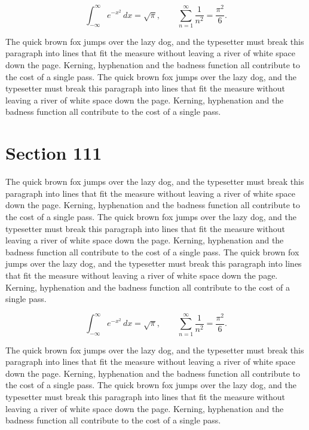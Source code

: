 \documentclass{article}
\begin{document}
\begin{equation}
\int_{-\infty}^{\infty} e^{-x^{2}}\,dx = \sqrt{\pi}, \qquad
\sum_{n=1}^{\infty} \frac{1}{n^{2}} = \frac{\pi^{2}}{6}.
\end{equation}

The quick brown fox jumps over the lazy dog, and the typesetter must break this paragraph into lines that fit the measure without leaving a river of white space down the page. Kerning, hyphenation and the badness function all contribute to the cost of a single pass. The quick brown fox jumps over the lazy dog, and the typesetter must break this paragraph into lines that fit the measure without leaving a river of white space down the page. Kerning, hyphenation and the badness function all contribute to the cost of a single pass. 
\section{Section 111}
The quick brown fox jumps over the lazy dog, and the typesetter must break this paragraph into lines that fit the measure without leaving a river of white space down the page. Kerning, hyphenation and the badness function all contribute to the cost of a single pass. The quick brown fox jumps over the lazy dog, and the typesetter must break this paragraph into lines that fit the measure without leaving a river of white space down the page. Kerning, hyphenation and the badness function all contribute to the cost of a single pass. The quick brown fox jumps over the lazy dog, and the typesetter must break this paragraph into lines that fit the measure without leaving a river of white space down the page. Kerning, hyphenation and the badness function all contribute to the cost of a single pass. 

\begin{equation}
\int_{-\infty}^{\infty} e^{-x^{2}}\,dx = \sqrt{\pi}, \qquad
\sum_{n=1}^{\infty} \frac{1}{n^{2}} = \frac{\pi^{2}}{6}.
\end{equation}

The quick brown fox jumps over the lazy dog, and the typesetter must break this paragraph into lines that fit the measure without leaving a river of white space down the page. Kerning, hyphenation and the badness function all contribute to the cost of a single pass. The quick brown fox jumps over the lazy dog, and the typesetter must break this paragraph into lines that fit the measure without leaving a river of white space down the page. Kerning, hyphenation and the badness function all contribute to the cost of a single pass. 
\end{document}
